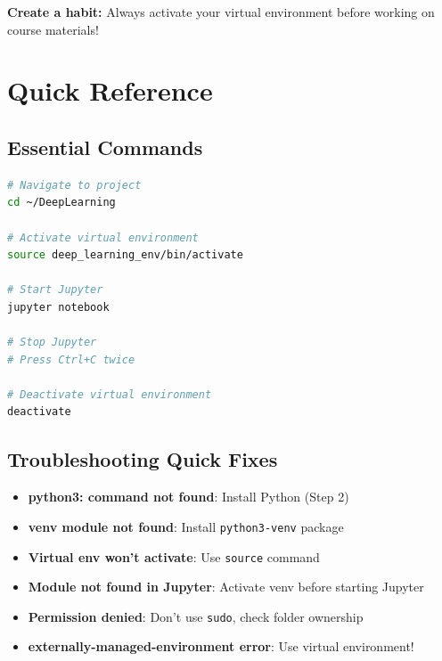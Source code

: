 \documentclass[11pt,a4paper]{article}
\begin{document}
\begin{tipbox}
\textbf{Create a habit:} Always activate your virtual environment before working on course materials!
\end{tipbox}

\section{Quick Reference}

\subsection{Essential Commands}

\begin{lstlisting}[language=bash]
# Navigate to project
cd ~/DeepLearning

# Activate virtual environment
source deep_learning_env/bin/activate

# Start Jupyter
jupyter notebook

# Stop Jupyter
# Press Ctrl+C twice

# Deactivate virtual environment
deactivate
\end{lstlisting}

\subsection{Troubleshooting Quick Fixes}

\begin{itemize}
    \item \textbf{python3: command not found}: Install Python (Step 2)
    \item \textbf{venv module not found}: Install \texttt{python3-venv} package
    \item \textbf{Virtual env won't activate}: Use \texttt{source} command
    \item \textbf{Module not found in Jupyter}: Activate venv before starting Jupyter
    \item \textbf{Permission denied}: Don't use \texttt{sudo}, check folder ownership
    \item \textbf{externally-managed-environment error}: Use virtual environment!
\end{itemize}
\end{document}
